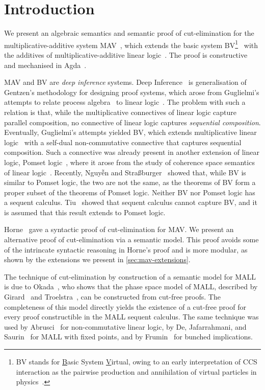 \section{Introduction}\label{sec:introduction}

We present an algebraic semantics and semantic proof of cut-elimination for the multiplicative-additive system MAV~\cite{Horne15:mav}, which extends the basic system BV\footnote{
      BV stands for \underline{B}asic System \underline{V}irtual, owing to an early interpretation of CCS interaction as the pairwise production and annihilation of virtual particles in physics~\cite[]{Horne15:mav}.
}~\cite{Guglielmi99:bv,Guglielmi07:sis} with the additives of multiplicative-additive linear logic~\cite[MALL]{Girard87:ll}.
The proof is constructive and mechanised in Agda~\cite{Agda264}.

MAV and BV are \emph{deep inference} systems. Deep Inference~\cite{Guglielmi14:di} is generalisation of Gentzen's methodology for designing proof systems, which arose from Guglielmi's attempts to relate process algebra~\cite[CCS]{Milner80:CCS,Milner89:CC} to linear logic~\cite{Girard87:ll}.
The problem with such a relation is that, while the multiplicative connectives of linear logic capture parallel composition, no connective of linear logic captures \emph{sequential composition}.
Eventually, Guglielmi's attempts yielded BV, which extends multiplicative linear logic~\cite[MLL]{Girard87:ll} with a self-dual non-commutative connective that captures sequential composition.
Such a connective was already present in another extension of linear logic, Pomset logic~\cite{Retore97:pomset}, where it arose from the study of coherence space semantics of linear logic~\cite[]{GirardTL89:proofs}.
Recently, Nguyễn and Stra{\ss}burger~\cite{NguyenS22:bvisnotpl} showed that, while BV is similar to Pomset logic, the two are not the same, as the theorems of BV form a proper subset of the theorems of Pomset logic.
Neither BV nor Pomset logic has a sequent calculus. Tiu~\cite{Tiu06:sisii} showed that sequent calculus cannot capture BV, and it is assumed that this result extends to Pomset logic.

Horne~\cite{Horne15:mav} gave a syntactic proof of cut-elimination for MAV. We present an alternative proof of cut-elimination via a semantic model. This proof avoids some of the intrincate syntactic reasoning in Horne's proof and is more modular, as shown by the extensions we present in \cref{sec:mav-extensions}.

The technique of cut-elimination by construction of a semantic model for MALL is due to Okada~\cite{Okada99:psc}, who shows that the phase space model of MALL, described by Girard~\cite[\S4.1]{Girard87:ll} and Troelstra~\cite[]{Troelstra92:lll}, can be constructed from cut-free proofs.
The completeness of this model directly yields the existence of a cut-free proof for every proof constructible in the MALL sequent calculus.
The same technique was used by Abrusci~\cite{Abrusci91:psc} for non-commutative linear logic, by De, Jafarrahmani, and Saurin~\cite{De22:psc} for MALL with fixed points, and by Frumin~\cite{Frumin22:psc} for bunched implications.

